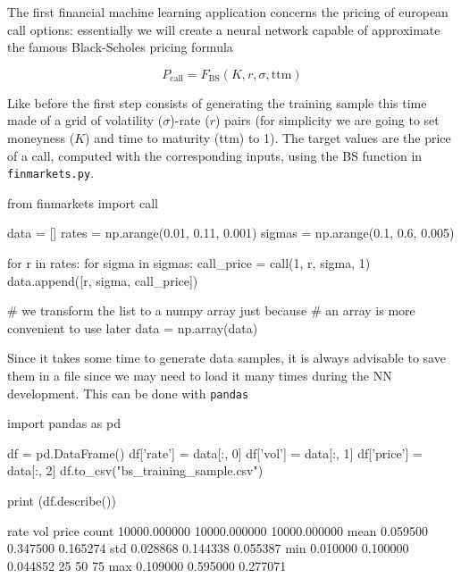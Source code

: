 The first financial machine learning application concerns the pricing of european
call options: essentially we will create a neural network capable of
approximate the famous Black-Scholes pricing formula

\begin{equation} 
	P_\textrm{call} = F_\textrm{BS}(K, r, \sigma, \mathrm{ttm})
\end{equation}

Like before the first step consists of generating the training sample this time made
of a grid of volatility ($\sigma$)-rate ($r$) pairs (for simplicity we
are going to set moneyness ($K$) and time to maturity (ttm) to 1). The target values
are the price of a call, computed with the corresponding inputs, using the BS function in \texttt{finmarkets.py}.

\begin{ipython}
from finmarkets import call

data = []
rates = np.arange(0.01, 0.11, 0.001)
sigmas = np.arange(0.1, 0.6, 0.005)

for r in rates:
for sigma in sigmas:
call_price = call(1, r, sigma, 1)
data.append([r, sigma, call_price])

# we transform the list to a numpy array just because
# an array is more convenient to use later
data = np.array(data)
\end{ipython}

Since it takes some time to generate data samples, it is always
advisable to save them in a file since we may need to load it many times
during the NN development. This can be done with \texttt{pandas}

\begin{ipython}
import pandas as pd

df = pd.DataFrame()
df['rate'] = data[:, 0]
df['vol'] = data[:, 1]
df['price'] = data[:, 2]
df.to_csv("bs_training_sample.csv")

print (df.describe())
\end{ipython}
\begin{ioutput}
               rate           vol         price
count  10000.000000  10000.000000  10000.000000
mean       0.059500      0.347500      0.165274
std        0.028868      0.144338      0.055387
min        0.010000      0.100000      0.044852
25%
50%
75%
max        0.109000      0.595000      0.277071
\end{ioutput}

